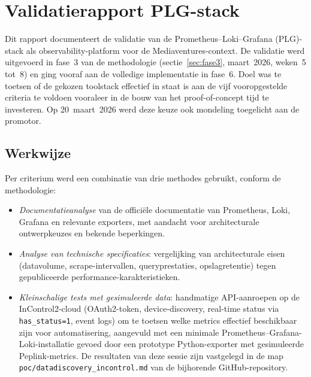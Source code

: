 
\chapter{Validatierapport PLG-stack}
\label{app:validatierapport}

Dit rapport documenteert de validatie van de Prometheus--Loki--Grafana (PLG)-stack als observability-platform voor de Mediaventures-context. De validatie werd uitgevoerd in fase~3 van de methodologie (sectie~\ref{sec:fase3}, maart~2026, weken~5 tot~8) en ging vooraf aan de volledige implementatie in fase~6. Doel was te toetsen of de gekozen toolstack effectief in staat is aan de vijf vooropgestelde criteria te voldoen vooraleer in de bouw van het proof-of-concept tijd te investeren. Op 20~maart~2026 werd deze keuze ook mondeling toegelicht aan de promotor.

\section*{Werkwijze}

Per criterium werd een combinatie van drie methodes gebruikt, conform de methodologie:

\begin{itemize}
  \item \emph{Documentatieanalyse} van de officiële documentatie van Prometheus, Loki, Grafana en relevante exporters, met aandacht voor architecturale ontwerpkeuzes en bekende beperkingen.
  \item \emph{Analyse van technische specificaties}: vergelijking van architecturale eisen (datavolume, scrape-intervallen, queryprestaties, opslagretentie) tegen gepubliceerde performance-karakteristieken.
  \item \emph{Kleinschalige tests met gesimuleerde data}: handmatige API-aanroepen op de InControl2-cloud (OAuth2-token, device-discovery, real-time status via \texttt{has\_status=1}, event logs) om te toetsen welke metrics effectief beschikbaar zijn voor automatisering, aangevuld met een minimale Prometheus--Grafana-Loki-installatie gevoed door een prototype Python-exporter met gesimuleerde Peplink-metrics. De resultaten van deze sessie zijn vastgelegd in de map \texttt{poc/datadiscovery\_incontrol.md} van de bijhorende GitHub-repository.
\end{itemize}

